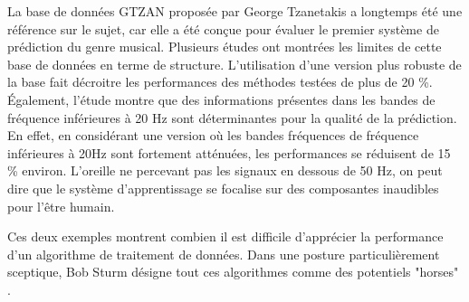   La base de données GTZAN proposée par George Tzanetakis a longtemps été une référence sur le sujet, car elle a été conçue pour évaluer le premier système de prédiction du genre musical\cite{tzanetakis2002musical}. Plusieurs études ont montrées les limites de cette base de données en terme de structure. L'utilisation d'une version plus robuste de la base fait décroitre les performances des méthodes testées de plus de 20 \%. \'Egalement, l'étude montre que des informations présentes dans les bandes de fréquence inférieures à 20 Hz sont déterminantes pour la qualité de la prédiction. En effet, en considérant une version où les bandes fréquences de fréquence inférieures à 20Hz sont fortement atténuées, les performances se réduisent de 15 \% environ. L'oreille ne percevant pas les signaux en dessous de 50 Hz, on peut dire que le système d'apprentissage se focalise sur des composantes inaudibles pour l'être humain.

  Ces deux exemples montrent combien il est difficile d'apprécier la performance d'un algorithme de traitement de données. Dans une posture particulièrement sceptique, Bob Sturm désigne tout ces algorithmes comme des potentiels "horses"  .

